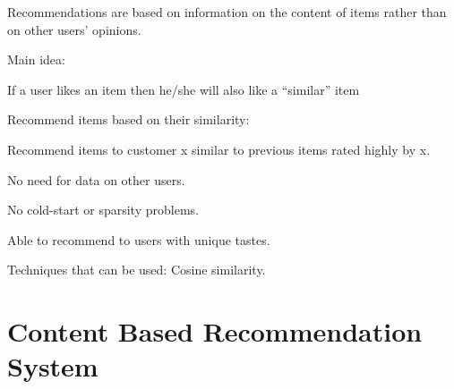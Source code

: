 	\begin{bulletedlist}
		\item Recommendations are based on information on the content of items rather than on other users' opinions.
		\item Main idea:
		\item If a user likes an item then he/she will also like a “similar” item
		\item Recommend items based on their similarity:
		\begin{bulletedlist}
			\item Recommend items to customer x similar to previous items rated highly by x.
		\end{bulletedlist}
		\item No need for data on other users.
		\begin{bulletedlist}
			\item No cold-start or sparsity problems.
		\end{bulletedlist}
		\item Able to recommend to users with unique tastes.
		\item Techniques that can be used: Cosine similarity.
	\end{bulletedlist}

	\section{Content Based Recommendation System}

